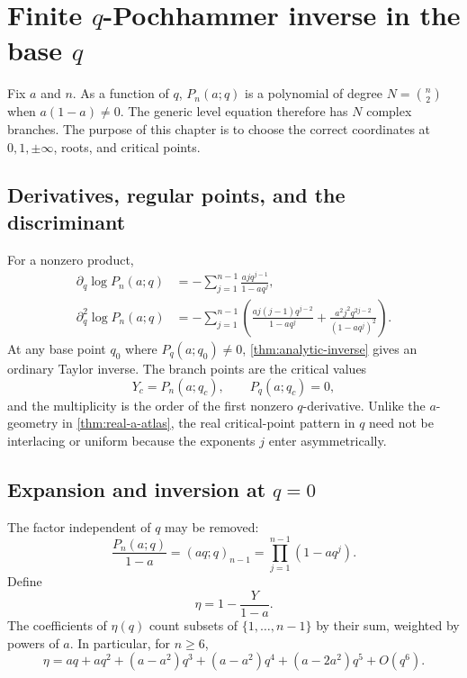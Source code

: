 \documentclass[11pt,a4paper,oneside,openany]{book}
\theoremstyle{definition}
\theoremstyle{remark}
\begin{document}
\chapter{Finite \texorpdfstring{$q$}{q}-Pochhammer inverse in the base \texorpdfstring{$q$}{q}}

Fix \(a\) and \(n\).  As a function of \(q\), \(P_n(a;q)\) is a polynomial
of degree \(N=\binom n2\) when \(a(1-a)\ne0\).  The generic level equation
therefore has \(N\) complex branches.  The purpose of this chapter is to
choose the correct coordinates at \(0,1,\pm\infty\), roots, and critical
points.

\section{Derivatives, regular points, and the discriminant}

For a nonzero product,
\begin{align}
 \partial_q\log P_n(a;q)
 &=-\sum_{j=1}^{n-1}\frac{ajq^{j-1}}{1-aq^j},
 \label{eq:q-log-derivative}\\
 \partial_q^2\log P_n(a;q)
 &=-\sum_{j=1}^{n-1}
 \left(\frac{aj(j-1)q^{j-2}}{1-aq^j}
 +\frac{a^2j^2q^{2j-2}}{(1-aq^j)^2}\right).
 \label{eq:q-log-second}
\end{align}
At any base point \(q_0\) where \(P_q(a;q_0)\ne0\),
\cref{thm:analytic-inverse} gives an ordinary Taylor inverse.  The branch
points are the critical values
\[
 Y_c=P_n(a;q_c),\qquad P_q(a;q_c)=0,
\]
and the multiplicity is the order of the first nonzero \(q\)-derivative.
Unlike the \(a\)-geometry in \cref{thm:real-a-atlas}, the real critical-point
pattern in \(q\) need not be interlacing or uniform because the exponents
\(j\) enter asymmetrically.

\section{Expansion and inversion at \texorpdfstring{$q=0$}{q=0}}

The factor independent of \(q\) may be removed:
\begin{equation}\label{eq:qzero-factor}
 \frac{P_n(a;q)}{1-a}=(aq;q)_{n-1}
 =\prod_{j=1}^{n-1}(1-aq^j).
\end{equation}
Define
\[
 \eta=1-\frac{Y}{1-a}.
\]
The coefficients of \(\eta(q)\) count subsets of
\(\{1,\ldots,n-1\}\) by their sum, weighted by powers of \(a\).  In
particular, for \(n\ge6\),
\begin{equation}\label{eq:eta-qzero}
 \eta=aq+aq^2+(a-a^2)q^3+(a-a^2)q^4+(a-2a^2)q^5+O(q^6).
\end{equation}
\end{document}
